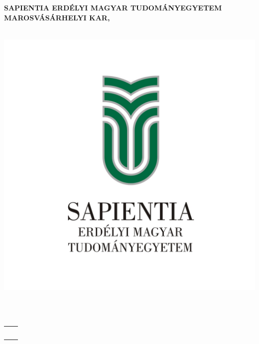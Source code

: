 \begin{titlepage}
	\begin{center}
	
		\large{\bfseries SAPIENTIA ERDÉLYI MAGYAR TUDOMÁNYEGYETEM} \\
		\large{\bfseries MAROSVÁSÁRHELYI KAR,} \\
		\large{\bfseries \szakHU} \\[2.5cm]
			\begin{center}
			\includegraphics[scale=2]{images/sapientia-hu}
		\end{center}
		\vspace{0.4cm}
		\Large{\Large  \cimHu}\\[0.8cm]
		\vspace{0.2cm}
		\textsc{\Large \bfseries \dolgozattipusHU}\\[2.5cm]
		
		{
			\large
		
			\renewcommand{\arraystretch}{0.85}
			\begin{tabular}{cc}
				  \makebox[6.5cm]{Témavezető:} & \makebox[6.5cm]{Végzős hallgató:} \\ \noalign{\smallskip}
				  \makebox[6.5cm]{\temavezetoA,} & \makebox[6.5cm]{\szerzo} \\ {\temavezetoAfokozat} \\
				  \makebox[6.5cm]{\temavezetoB,} & \\ {\temavezetoBfokozat} \\
			\end{tabular}
		}
		
		\vfill
		{\large \bfseries \ev}
	\end{center}
\end{titlepage}